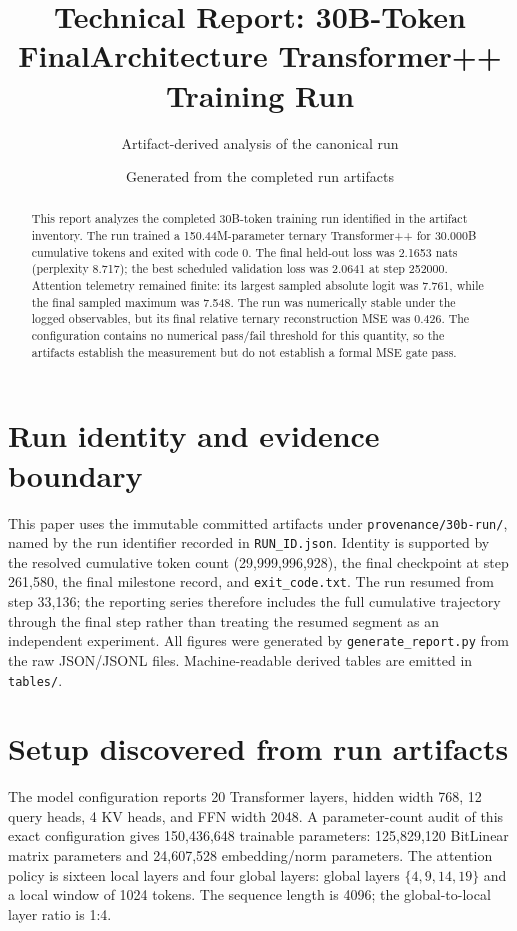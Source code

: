 \documentclass[10pt]{article}
\title{Technical Report: 30B-Token FinalArchitecture Transformer++ Training Run}
\author{Artifact-derived analysis of the canonical run}
\date{Generated from the completed run artifacts}
\begin{document}
\maketitle

\begin{abstract}
This report analyzes the completed 30B-token training run identified in the artifact inventory. The run trained a 150.44M-parameter ternary Transformer++ for 30.000B cumulative tokens and exited with code 0. The final held-out loss was 2.1653 nats (perplexity 8.717); the best scheduled validation loss was 2.0641 at step 252000. Attention telemetry remained finite: its largest sampled absolute logit was 7.761, while the final sampled maximum was 7.548. The run was numerically stable under the logged observables, but its final relative ternary reconstruction MSE was 0.426. The configuration contains no numerical pass/fail threshold for this quantity, so the artifacts establish the measurement but do not establish a formal MSE gate pass.
\end{abstract}

\section{Run identity and evidence boundary}
This paper uses the immutable committed artifacts under \texttt{provenance/30b-run/}, named by the run identifier recorded in \texttt{RUN\_ID.json}. Identity is supported by the resolved cumulative token count (29,999,996,928), the final checkpoint at step 261,580, the final milestone record, and \texttt{exit\_code.txt}. The run resumed from step 33,136; the reporting series therefore includes the full cumulative trajectory through the final step rather than treating the resumed segment as an independent experiment. All figures were generated by \texttt{generate\_report.py} from the raw JSON/JSONL files. Machine-readable derived tables are emitted in \texttt{tables/}.

\section{Setup discovered from run artifacts}
The model configuration reports 20 Transformer layers, hidden width 768, 12 query heads, 4 KV heads, and FFN width 2048. A parameter-count audit of this exact configuration gives 150,436,648 trainable parameters: 125,829,120 BitLinear matrix parameters and 24,607,528 embedding/norm parameters. The attention policy is sixteen local layers and four global layers: global layers $\{4,9,14,19\}$ and a local window of 1024 tokens. The sequence length is 4096; the global-to-local layer ratio is 1:4.
\end{document}
